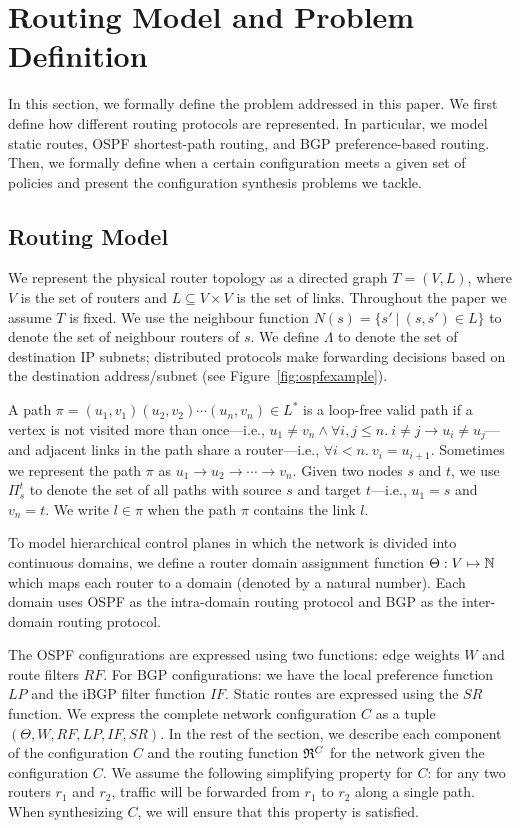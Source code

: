 \section{Routing Model and Problem Definition}
In this section, we formally define the problem addressed in this
paper.  We first define how different
routing protocols are represented.  In particular, we model static
routes, OSPF shortest-path routing, and BGP preference-based routing.
Then, we formally define when a certain configuration meets a given
set of policies and present the configuration synthesis problems
we tackle.

\subsection{Routing Model}

We represent the physical router topology as a directed graph $T=(V, L)$,
where $V$ is the set of routers and $L\subseteq V\times V$ is the set of links. 
Throughout the paper we assume $T$ is fixed.
We use the neighbour function $N(s) = \{s'\ | \ (s,s') \in L \}$ to denote 
the set of neighbour routers of $s$. 
We define $\Lambda$ to denote the set of destination IP subnets;
distributed protocols make forwarding decisions based on the 
destination address/subnet (see Figure~\ref{fig:ospfexample}).

A path $\pi = (u_1,v_1) (u_2, v_2) \cdots (u_n, v_n) \in L^*$ is a loop-free valid path if
a  vertex is not visited more than once---i.e.,
$u_1\neq v_n\wedge\forall i,j \leq n. 
~i \not= j \rightarrow u_i \not= u_j$---and adjacent links in the
path share a router---i.e., $\forall i < n. ~v_i = u_{i+1}$.
Sometimes we represent the path $\pi$ as $u_1\rightarrow u_2 \rightarrow  \cdots \rightarrow v_n$.
Given two nodes $s$ and $t$, we use $\Pi_s^t$ to denote the set of all paths
with source $s$ and target $t$---i.e., $u_1=s$ and  $v_n=t$. 
We write $l \in \pi$ when the path $\pi$ contains the link $l$. 

To model hierarchical control planes in which
 the network is divided into continuous domains,
we define a router domain assignment function
$\Theta: V \mapsto \mathbb{N}$ which maps each router to a domain 
(denoted by a natural number).
Each domain uses OSPF as the intra-domain routing protocol
and BGP as the inter-domain routing protocol. 


The OSPF configurations are expressed 
using two functions: edge weights $W$ and
 route filters $RF$. For BGP configurations: 
we have the local preference function $LP$ 
and the iBGP filter function $IF$. Static 
routes are expressed using the $SR$ function.
We express the complete network configuration $C$
as a tuple $(\Theta,W,RF,LP,IF,SR)$.  In the 
rest of the section, we describe each component 
of the configuration $C$ and the routing function 
$\mathfrak{R}^C$ for the network given the configuration $C$. 
We assume the following  
simplifying property for $C$: for any two 
routers $r_1$ and $r_2$,
traffic will be forwarded from $r_1$ to $r_2$ 
along a single path. 
When synthesizing $C$, we will ensure that this property is satisfied.


